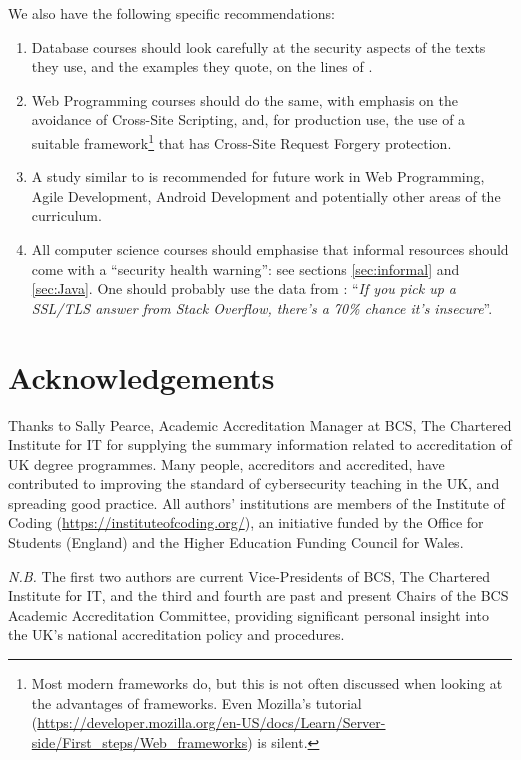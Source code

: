\documentclass[conference]{IEEEtran}
\begin{document}
We also have the following specific recommendations:

\begin{enumerate}
\item Database courses should look carefully at the security aspects of the texts they use, and the examples they quote, on the lines of \cite{Drop2019}.
\item Web Programming courses should  do the same, with emphasis on the avoidance of Cross-Site Scripting, and, for production use, the use of a suitable framework\footnote{Most modern frameworks do, but this is not often discussed when looking at the advantages of frameworks. Even Mozilla's tutorial (\url{https://developer.mozilla.org/en-US/docs/Learn/Server-side/First_steps/Web_frameworks}) is silent.} that has Cross-Site Request Forgery protection. 
\item A study similar to \cite{Drop2019} is recommended for future work in Web Programming, Agile Development, Android Development and potentially other areas of the curriculum.
\item All computer science courses should emphasise that informal resources should come with a ``security health warning'': see sections \ref{sec:informal} and \ref{sec:Java}. One should probably use the data from \cite{Chenetal2019a}: ``{\emph{If you pick up a SSL/TLS answer from Stack Overflow, there's a 70\% chance it's insecure}}''.
\end{enumerate}

\section*{Acknowledgements}
Thanks to Sally Pearce, Academic Accreditation Manager at BCS, The Chartered Institute for IT for supplying the summary information related to accreditation of UK degree programmes. Many people, accreditors and accredited, have contributed to improving the standard of cybersecurity teaching in the UK, and spreading good practice.  All authors' institutions are members of the Institute of Coding (\url{https://instituteofcoding.org/}), an initiative funded by the Office for Students (England) and the Higher Education Funding Council for Wales.
\par
{\emph{N.B.}} The first two authors are current Vice-Presidents of BCS, The Chartered Institute for IT, and the third and fourth are past and present Chairs of the BCS Academic Accreditation Committee, providing significant personal insight into the UK's national accreditation policy and procedures.



 
\end{document}

